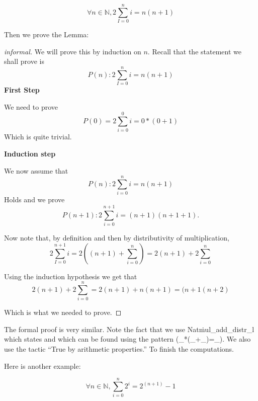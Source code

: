 \begin{lemma}
$$\forall n \in \mathbb{N},  2\sum_{I=0}^{n} i = n(n+1)$$
\end{lemma}



Then we prove the Lemma:
\begin{proof}[informal]
We will prove this by induction on $n$. Recall that the statement we shall prove is
$$P(n): 2\sum_{I=0}^{n} i = n(n+1)$$
{\bf First Step}

We need to prove $$P(0) = 2\sum_{i=0}^{0} i = 0*(0+1)$$
Which is quite trivial.

{\bf Induction step}

We now assume that
$$P(n): 2\sum_{i=0}^{n} i = n(n+1)$$
Holds and we prove
$$P(n+1): 2\sum_{i=0}^{n+1} i = (n+1)(n+1+1).$$

Now note that, by definition and then by distributivity of multiplication,
$$2\sum_{I=0}^{n+1} i = 2((n+1) +  \sum_{i=0}^{n})  =2(n+1) +  2\sum_{i=0}^{n}$$

Using the induction hypothesis we get that
$$2(n+1) +  2\sum_{i=0}^{n} = 2(n+1) + n(n+1) = (n+1(n+2)$$

Which is what we needed to prove.
\end{proof}

The formal proof is very similar. Note the fact that we use Nat\.mul\_add\_distr\_l which states
     and which can be found using the pattern (\_*(\_+\_)=\_). We also use the tactic ``True by arithmetic properties.'' To finish the computations.


Here is another example:

\begin{lemma}
$$\forall n\in \mathbb{N}, \sum_{i=0}^{n} 2^{i}= 2^{(n+1)}-1$$
\end{lemma}

